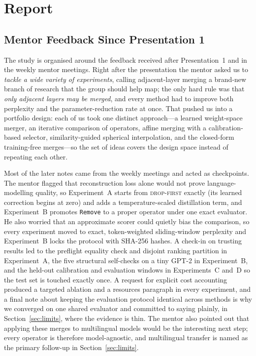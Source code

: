 \documentclass[10pt,a4paper]{article}
\newcommand{\dropfirst}{\textsc{drop-first}}
\newcommand{\removeop}{\texttt{Remove}}
\begin{document}
\section{Report}

\subsection{Mentor Feedback Since Presentation 1}
\label{sec:feedback}

The study is organised around the feedback received after Presentation~1 and
in the weekly mentor meetings. Right after the presentation the mentor asked us
to \emph{tackle a wide variety of experiments}, calling adjacent-layer merging
a brand-new branch of research that the group should help map; the only hard
rule was that \emph{only adjacent layers may be merged}, and every method had
to improve both perplexity and the parameter-reduction rate at once. That
pushed us into a portfolio design: each of us took one distinct
approach---a learned weight-space merger, an iterative comparison of
operators, affine merging with a calibration-based selector,
similarity-guided spherical interpolation, and the closed-form training-free
merges---so the set of ideas covers the design space instead of repeating each
other.

Most of the later notes came from the weekly meetings and acted as
checkpoints. The mentor flagged that reconstruction loss alone would not prove
language-modelling quality, so Experiment~A starts from \dropfirst{} exactly
(its learned correction begins at zero) and adds a temperature-scaled
distillation term, and Experiment~B promotes \removeop{} to a proper operator
under one exact evaluator. He also worried that an approximate scorer could
quietly bias the comparison, so every experiment moved to exact,
token-weighted sliding-window perplexity and Experiment~B locks the protocol
with SHA-256 hashes. A check-in on trusting results led to the preflight
equality check and disjoint ranking partition in Experiment~A, the five
structural self-checks on a tiny GPT-2 in Experiment~B, and the held-out
calibration and evaluation windows in Experiments~C and~D so the test set is
touched exactly once. A request for explicit cost accounting produced a
targeted ablation and a resources paragraph in every experiment, and a final
note about keeping the evaluation protocol identical across methods is why we
converged on one shared evaluator and committed to saying plainly, in
Section~\ref{sec:limits}, where the evidence is thin. The mentor also pointed
out that applying these merges to multilingual models would be the interesting
next step; every operator is therefore model-agnostic, and multilingual
transfer is named as the primary follow-up in Section~\ref{sec:limits}.
\end{document}

